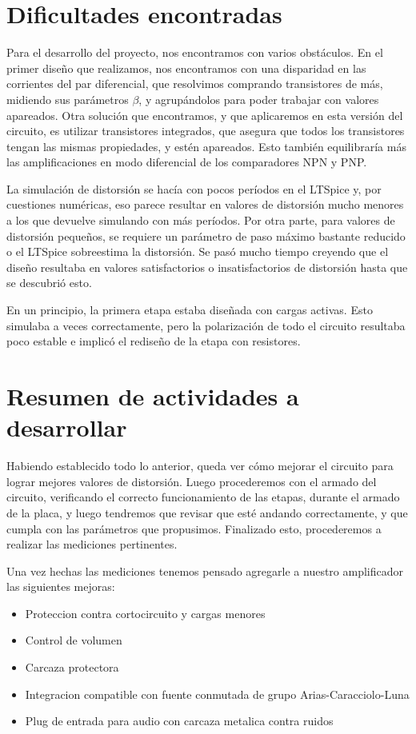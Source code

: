 \documentclass[a4paper,12pt,twoside]{article}
\begin{document}
\section{Dificultades encontradas}


Para el desarrollo del proyecto, nos encontramos con varios obstáculos. En el primer diseño que realizamos, nos encontramos con una disparidad en las corrientes del par diferencial, que resolvimos comprando transistores de más, midiendo sus parámetros $\beta$, y agrupándolos para poder trabajar con valores apareados. Otra solución que encontramos, y que aplicaremos en esta versión del circuito, es utilizar transistores integrados, que asegura que todos los transistores tengan las mismas propiedades, y estén apareados. Esto también equilibraría más las amplificaciones en modo diferencial de los comparadores NPN y PNP.

La simulación de distorsión se hacía con pocos períodos en el LTSpice y, por cuestiones numéricas, eso parece resultar en valores de distorsión mucho menores a los que devuelve simulando con más períodos. Por otra parte, para valores de distorsión pequeños, se requiere un parámetro de paso máximo bastante reducido o el LTSpice sobreestima la distorsión. Se pasó mucho tiempo creyendo que el diseño resultaba en valores satisfactorios o insatisfactorios de distorsión hasta que se descubrió esto.

En un principio, la primera etapa estaba diseñada con cargas activas. Esto simulaba a veces correctamente, pero la polarización de todo el circuito resultaba poco estable e implicó el rediseño de la etapa con resistores.


\section{Resumen de actividades a desarrollar}

Habiendo establecido todo lo anterior, queda ver cómo mejorar el circuito para lograr mejores valores de distorsión. Luego procederemos con el armado del circuito, verificando el correcto funcionamiento de las etapas, durante el armado de la placa, y luego tendremos que revisar que esté andando correctamente, y que cumpla con las parámetros que propusimos. Finalizado esto, procederemos a realizar las mediciones pertinentes.

Una vez hechas las mediciones tenemos pensado agregarle a nuestro amplificador las siguientes mejoras:
\begin{itemize}
\item{Proteccion contra cortocircuito y cargas menores}
\item{Control de volumen}
\item{Carcaza protectora}
\item{Integracion compatible con fuente conmutada de grupo Arias-Caracciolo-Luna}
\item{Plug de entrada para audio con carcaza metalica contra ruidos}
\end{itemize}
\newpage
\end{document}
